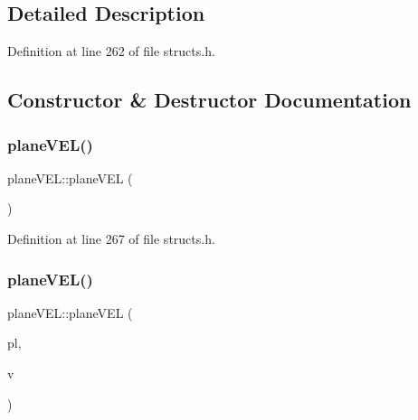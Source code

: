 \subsection{Detailed Description}


Definition at line 262 of file structs.\+h.



\subsection{Constructor \& Destructor Documentation}
\mbox{\label{structplane_v_e_l_a23bf21cc557fa38db7a07cf77a22973d}} 
\subsubsection{\texorpdfstring{plane\+V\+E\+L()}{planeVEL()}\hspace{0.1cm}{\footnotesize\ttfamily [1/2]}}
{\footnotesize\ttfamily plane\+V\+E\+L\+::plane\+V\+EL (\begin{DoxyParamCaption}{ }\end{DoxyParamCaption})\hspace{0.3cm}{\ttfamily [inline]}}



Definition at line 267 of file structs.\+h.

\mbox{\label{structplane_v_e_l_a6213d9d6eb1591469b48157ee1c0110b}} 
\subsubsection{\texorpdfstring{plane\+V\+E\+L()}{planeVEL()}\hspace{0.1cm}{\footnotesize\ttfamily [2/2]}}
{\footnotesize\ttfamily plane\+V\+E\+L\+::plane\+V\+EL (\begin{DoxyParamCaption}\item[{\mbox{\hyperlink{structplane}{plane}}}]{pl,  }\item[{std\+::vector$<$ \mbox{\hyperlink{structvertex_edge_list}{vertex\+Edge\+List}} $>$}]{v }\end{DoxyParamCaption})\hspace{0.3cm}{\ttfamily [inline]}}



